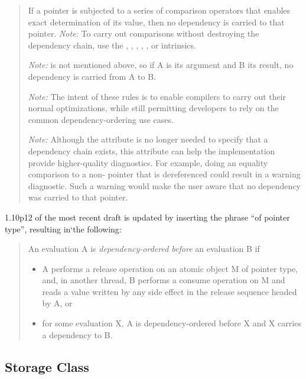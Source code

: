 \documentclass[letterpaper,twocolumn,10pt]{article}
\begin{document}
\begin{quote}
	If a pointer is subjected to a series of comparison operators
	that enables exact determination of its value, then no dependency
	is carried to that pointer.
	\emph{Note:} To carry out comparisons without destroying the
	dependency chain, use the
	,
	,
	,
	,
	, or
	intrinsics.

	\emph{Note:}  is not mentioned above,
	so if A is its argument and B its result, no dependency is carried
	from A to B.

	\emph{Note:} The intent of these rules is to enable compilers
	to carry out their normal optimizations, while still permitting
	developers to rely on the common dependency-ordering use cases.

	\emph{Note:} Although the  attribute
	is no longer needed to specify that a dependency chain exists,
	this attribute can help the implementation provide higher-quality
	diagnostics.
	For example, doing an equality comparison to a non-
	pointer that is dereferenced could result in a warning
	diagnostic.
	Such a warning would make the user aware that no dependency was
	carried to that pointer.
\end{quote}

1.10p12 of the most recent draft is updated by inserting the phrase
``of pointer type'', resulting in`the following:

\begin{quote}
	An evaluation A is \emph{dependency-ordered before} an evaluation B if
	\begin{itemize}
	\item	A performs a release operation on an atomic object M
		of pointer type,
		and, in another thread, B performs a consume operation
		on M and reads a value written by any side effect in
		the release sequence headed by A, or
	\item	for some evaluation X, A is dependency-ordered before X
		and X carries a dependency to B.
	\end{itemize}
\end{quote}

\subsection{Storage Class}
\label{sec:Storage Class}
\end{document}

